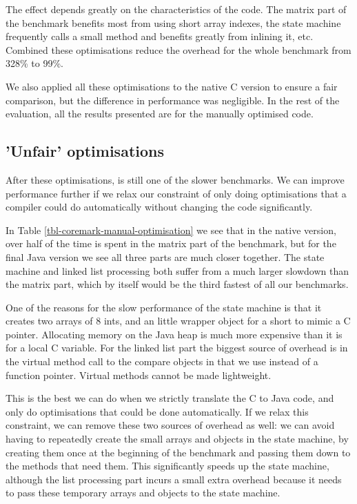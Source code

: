 The effect depends greatly on the characteristics of the code. The matrix part of the benchmark benefits most from using short array indexes, the state machine frequently calls a small method and benefits greatly from inlining it, etc. Combined these optimisations reduce the overhead for the whole benchmark from 328\% to 99\%.

We also applied all these optimisations to the native C version to ensure a fair comparison, but the difference in performance was negligible. In the rest of the evaluation, all the results presented are for the manually optimised code.

\subsection{'Unfair' optimisations}
\label{sec-evaluation-coremark-unfair-optimisations}
After these optimisations,  is still one of the slower benchmarks. We can improve performance further if we relax our constraint of only doing optimisations that a compiler could do automatically without changing the code significantly.

In Table \ref{tbl-coremark-manual-optimisation} we see that in the native version, over half of the time is spent in the matrix part of the benchmark, but for the final Java version we see all three parts are much closer together. The state machine and linked list processing both suffer from a much larger slowdown than the matrix part, which by itself would be the third fastest of all our benchmarks.

One of the reasons for the slow performance of the state machine is that it creates two arrays of 8 ints, and an little wrapper object for a short to mimic a C pointer. Allocating memory on the Java heap is much more expensive than it is for a local C variable. For the linked list part the biggest source of overhead is in the virtual method call to the compare objects in  that we use instead of a function pointer. Virtual methods cannot be made lightweight.

This is the best we can do when we strictly translate the C to Java code, and only do optimisations that could be done automatically. If we relax this constraint, we can remove these two sources of overhead as well: we can avoid having to repeatedly create the small arrays and objects in the state machine, by creating them once at the beginning of the benchmark and passing them down to the methods that need them. This significantly speeds up the state machine, although the list processing part incurs a small extra overhead because it needs to pass these temporary arrays and objects to the state machine.

